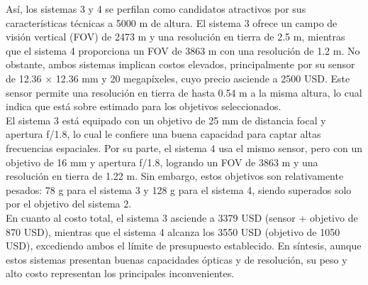 \noindent Así, los sistemas 3 y 4 se perfilan como candidatos atractivos por sus características técnicas a 5000 m de altura. El sistema 3 ofrece un campo de visión vertical (FOV) de 2473 m y una resolución en tierra de 2.5 m, mientras que el sistema 4 proporciona un FOV de 3863 m con una resolución de 1.2 m. No obstante, ambos sistemas implican costos elevados, principalmente por su sensor de 12.36 $\times$ 12.36 mm y 20 megapíxeles, cuyo precio asciende a 2500 USD. Este sensor permite una resolución en tierra de hasta 0.54 m a la misma altura, lo cual indica que está sobre estimado para los objetivos seleccionados.\\

\noindent El sistema 3 está equipado con un objetivo de 25 mm de distancia focal y apertura f/1.8, lo cual le confiere una buena capacidad para captar altas frecuencias espaciales. Por su parte, el sistema 4 usa el mismo sensor, pero con un objetivo de 16 mm y apertura f/1.8, logrando un FOV de 3863 m y una resolución en tierra de 1.22 m. Sin embargo, estos objetivos son relativamente pesados: 78 g para el sistema 3 y 128 g para el sistema 4, siendo superados solo por el objetivo del sistema 2.\\

\noindent En cuanto al costo total, el sistema 3 asciende a 3379 USD (sensor + objetivo de 870 USD), mientras que el sistema 4 alcanza los 3550 USD (objetivo de 1050 USD), excediendo ambos el límite de presupuesto establecido. En síntesis, aunque estos sistemas presentan buenas capacidades ópticas y de resolución, su peso y alto costo representan los principales inconvenientes.\\


